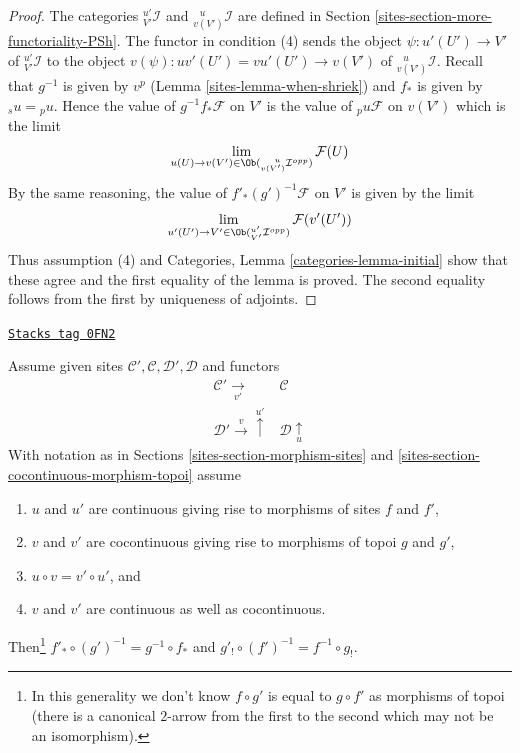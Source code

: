 \begin{proof}

The categories ${}^{u'}_{V'}\mathcal{I}$ and
${}^{\ \ \ u}_{v(V')}\mathcal{I}$ are defined in
Section \ref{sites-section-more-functoriality-PSh}.
The functor in condition (4) sends the object
$\psi : u'(U') \to V'$ of ${}^{u'}_{V'}\mathcal{I}$ to the object
$v(\psi) : uv'(U') = vu'(U') \to v(V')$ of ${}^{\ \ \ u}_{v(V')}\mathcal{I}$.
Recall that $g^{-1}$ is given by $v^p$ (Lemma \ref{sites-lemma-when-shriek}) and
$f_*$ is given by ${}_su = {}_pu$. Hence the value of
$g^{-1}f_*\mathcal{F}$ on $V'$ is the value of ${}_pu\mathcal{F}$
on $v(V')$ which is the limit
$$
\lim_{u(U) \to v(V') \in \Ob({}^{\ \ \ u}_{v(V')}\mathcal{I}^{opp})}
\mathcal{F}(U)
$$
By the same reasoning, the value of $f'_*(g')^{-1}\mathcal{F}$
on $V'$ is given by the limit
$$
\lim_{u'(U') \to V' \in \Ob({}^{u'}_{V'}\mathcal{I}^{opp})} \mathcal{F}(v'(U'))
$$
Thus assumption (4) and Categories, Lemma \ref{categories-lemma-initial}
show that these agree and the first equality of the
lemma is proved. The second equality follows from the first by uniqueness of
adjoints.
\end{proof}

\begin{lemma}
\label{sites-lemma-special-square-continuous}
\href{https://stacks.math.columbia.edu/tag/0FN2}{\texttt{Stacks tag 0FN2}}

Assume given sites $\mathcal{C}', \mathcal{C}, \mathcal{D}', \mathcal{D}$
and functors
$$
\begin{array}{cc}\mathcal{C}' \underset{v'}{\longrightarrow} & \mathcal{C} \\ \mathcal{D}' \overset{v}{\longrightarrow}\overset{u'}{\uparrow} & \mathcal{D} \underset{u}{\uparrow}\end{array}
$$
With notation as in Sections \ref{sites-section-morphism-sites}
and \ref{sites-section-cocontinuous-morphism-topoi} assume
\begin{enumerate}
\item $u$ and $u'$ are continuous giving rise to morphisms of
sites $f$ and $f'$,
\item $v$ and $v'$ are cocontinuous giving rise to morphisms
of topoi $g$ and $g'$,
\item $u \circ v = v' \circ u'$, and
\item $v$ and $v'$ are continuous as well as cocontinuous.
\end{enumerate}
Then\footnote{In this generality
we don't know $f \circ g'$ is equal to $g \circ f'$
as morphisms of topoi (there is a canonical $2$-arrow from
the first to the second which may not be an isomorphism).}
$f'_* \circ (g')^{-1} = g^{-1} \circ f_*$ and
$g'_! \circ (f')^{-1} = f^{-1} \circ g_!$.
\end{lemma}

